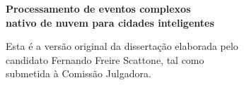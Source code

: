 \documentclass[11pt,twoside,a4paper]{book}
\begin{document}
%

%
\newpage
\thispagestyle{empty}
    \begin{center}
        \vspace*{2.3 cm}
        \textbf{\Large{Processamento de eventos complexos\\ nativo de nuvem para cidades inteligentes}}\\
        \vspace*{2 cm}
    \end{center}

    \vskip 2cm

    \begin{flushright}
	Esta é a versão original da dissertação elaborada pelo\\
	candidato Fernando Freire Scattone, tal como \\
	submetida à Comissão Julgadora.
    \end{flushright}

\pagebreak


%
%
%
%
\end{document}
